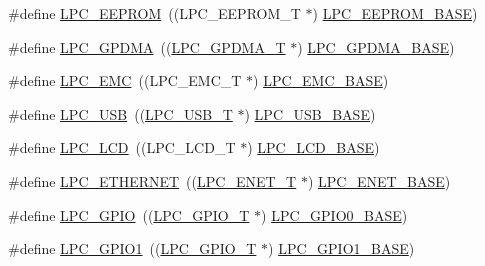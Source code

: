 \begin{DoxyCompactItemize}
\item 
\#define \hyperlink{group__PERIPH__407X__8X__BASE_ga3af7cc9a426f661ac4deee8a9997a830}{L\-P\-C\-\_\-\-E\-E\-P\-R\-O\-M}~((L\-P\-C\-\_\-\-E\-E\-P\-R\-O\-M\-\_\-\-T           $\ast$) \hyperlink{group__PERIPH__407X__8X__BASE_ga9d1fcaafb9feb0f8253c3cef1edc7e9f}{L\-P\-C\-\_\-\-E\-E\-P\-R\-O\-M\-\_\-\-B\-A\-S\-E})
\item 
\#define \hyperlink{group__PERIPH__407X__8X__BASE_gaf9d4b843ddff8d08a27880f90e2dbf18}{L\-P\-C\-\_\-\-G\-P\-D\-M\-A}~((\hyperlink{structLPC__GPDMA__T}{L\-P\-C\-\_\-\-G\-P\-D\-M\-A\-\_\-\-T}            $\ast$) \hyperlink{group__PERIPH__407X__8X__BASE_ga51ba8e3f33730fa2b78be3f892d8c278}{L\-P\-C\-\_\-\-G\-P\-D\-M\-A\-\_\-\-B\-A\-S\-E})
\item 
\#define \hyperlink{group__PERIPH__407X__8X__BASE_ga115afed5bd08559bbc4eba50e7c23495}{L\-P\-C\-\_\-\-E\-M\-C}~((L\-P\-C\-\_\-\-E\-M\-C\-\_\-\-T              $\ast$) \hyperlink{group__PERIPH__407X__8X__BASE_ga52f586bf3c6855ad4ef03b1fee3f2f0d}{L\-P\-C\-\_\-\-E\-M\-C\-\_\-\-B\-A\-S\-E})
\item 
\#define \hyperlink{group__PERIPH__407X__8X__BASE_gae77538a7f3f4850715c95283e38b423f}{L\-P\-C\-\_\-\-U\-S\-B}~((\hyperlink{structLPC__USB__T}{L\-P\-C\-\_\-\-U\-S\-B\-\_\-\-T}              $\ast$) \hyperlink{group__PERIPH__407X__8X__BASE_gaa619008881e9f76dc31131313eff1b79}{L\-P\-C\-\_\-\-U\-S\-B\-\_\-\-B\-A\-S\-E})
\item 
\#define \hyperlink{group__PERIPH__407X__8X__BASE_ga68cb24e38b29356c45f9bb634b35c677}{L\-P\-C\-\_\-\-L\-C\-D}~((L\-P\-C\-\_\-\-L\-C\-D\-\_\-\-T              $\ast$) \hyperlink{group__PERIPH__407X__8X__BASE_gae1746cd618a1eb4f24f95255594f159a}{L\-P\-C\-\_\-\-L\-C\-D\-\_\-\-B\-A\-S\-E})
\item 
\#define \hyperlink{group__PERIPH__407X__8X__BASE_gaddb977e4442891b21ced3344c71440d7}{L\-P\-C\-\_\-\-E\-T\-H\-E\-R\-N\-E\-T}~((\hyperlink{structLPC__ENET__T}{L\-P\-C\-\_\-\-E\-N\-E\-T\-\_\-\-T}             $\ast$) \hyperlink{group__PERIPH__407X__8X__BASE_ga73c18d53000abe3814c4b787cd83a57c}{L\-P\-C\-\_\-\-E\-N\-E\-T\-\_\-\-B\-A\-S\-E})
\item 
\#define \hyperlink{group__PERIPH__407X__8X__BASE_ga8fce6a072685922bf3ebc1aa9070f408}{L\-P\-C\-\_\-\-G\-P\-I\-O}~((\hyperlink{structLPC__GPIO__T}{L\-P\-C\-\_\-\-G\-P\-I\-O\-\_\-\-T}             $\ast$) \hyperlink{group__PERIPH__407X__8X__BASE_ga09e0e964ea1abf3b991772df2aa52405}{L\-P\-C\-\_\-\-G\-P\-I\-O0\-\_\-\-B\-A\-S\-E})
\item 
\#define \hyperlink{group__PERIPH__407X__8X__BASE_ga335587dad4e6d0da56c1f3ad1c087d10}{L\-P\-C\-\_\-\-G\-P\-I\-O1}~((\hyperlink{structLPC__GPIO__T}{L\-P\-C\-\_\-\-G\-P\-I\-O\-\_\-\-T}             $\ast$) \hyperlink{group__PERIPH__407X__8X__BASE_ga9fb0536853721a3073bd69d94d0b7ec2}{L\-P\-C\-\_\-\-G\-P\-I\-O1\-\_\-\-B\-A\-S\-E})

\end{DoxyCompactItemize}
